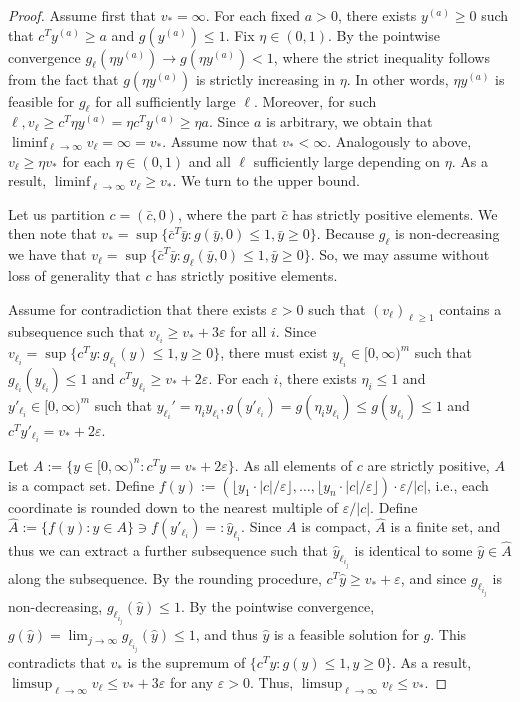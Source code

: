 \documentclass[a4paper, a4wide, 10pt, reqno]{amsart}
\theoremstyle{plain}
\begin{document}
\begin{proof}
    Assume first that $v_\ast=\infty$. For each fixed $a>0$, there exists $y^{(a)}\ge0$ such that $c^Ty^{(a)} \geq a$ and $g(y^{(a)})\leq 1$.
    Fix $\eta\in(0,1)$. By the pointwise convergence $g_\ell(\eta y^{(a)})\to g(\eta y^{(a)})<1$, where the strict inequality follows from the fact that $g(\eta y^{(a)})$ is strictly increasing in $\eta$. In other words, $\eta y^{(a)}$ is feasible for $g_\ell$ for all sufficiently large $\ell$. Moreover, for such $\ell, v_\ell\ge c^T \eta y^{(a)}=\eta c^Ty^{(a)}\ge \eta a$. Since $a$ is arbitrary, we obtain that $\liminf_{\ell\to\infty} v_\ell =\infty=v_\ast$.
    Assume now that $v_\ast<\infty$. Analogously to above, $v_\ell\ge \eta v_\ast$ for each $\eta\in(0,1)$ and all $\ell$ sufficiently large depending on $\eta$. As a result, $\liminf_{\ell \to\infty} v_\ell \ge v_\ast$. 
    We  turn to the upper bound. 

    Let us partition $c=(\bar{c},0)$, where the part $\bar{c}$ has strictly positive elements. We then note that $v_* = \sup\{\bar{c}^T \bar{y} : g(\bar{y},0) \leq 1, \bar{y} \geq 0\}$. Because $g_\ell$ is  non-decreasing 
    we have that 
$v_\ell = \sup\{\bar{c}^T \bar{y}: g_\ell(\bar{y},0) \leq 1, \bar{y}\geq 0\}.$ 
 So, we may assume without loss of generality that $c$ has strictly positive elements.
 
    Assume for contradiction that there exists $\varepsilon>0$ such that $(v_\ell)_{\ell\ge 1}$ contains a subsequence such that $v_{\ell_i} \ge v_\ast+3\varepsilon$ for all $i$. Since $v_{\ell_i}=\sup \{c^Ty: g_{\ell_i}(y)\le 1, y\ge 0\}$,  there must exist $y_{\ell_i}\in [0,\infty)^m$ such that $g_{\ell_i}(y_{\ell_i})\le 1$ and $c^T y_{\ell_i}\ge v_\ast+2\varepsilon$. For each $i$, there exists $\eta_i\leq 1$ and $y'_{\ell_i}\in[0,\infty)^m$ such that $y_{\ell_i}'=\eta_i y_{\ell_i},  g(y'_{\ell_i}) = g(\eta_i y_{\ell_i}) \le g(y_{\ell_i}) \le 1$ and $c^Ty'_{\ell_i}=v_\ast+2\varepsilon$. 


    Let $A:=\{y\in[0,\infty)^n: c^Ty=v_\ast + 2\varepsilon\}$. As all elements of $c$ are strictly positive, $A$ is a compact set. 
    Define $f(y):=(\lfloor y_1\cdot |c|/\varepsilon\rfloor, \ldots, \lfloor y_n\cdot |c|/\varepsilon\rfloor)\cdot \varepsilon/|c|$, i.e., each coordinate is rounded down to the nearest multiple of $\varepsilon/|c|$. Define $\hat A:=\{f(y): y\in A\}\ni f(y'_{\ell_i})=: \hat y_{\ell_i}$. Since $A$ is compact, $\hat A$ is a finite set, and thus we can extract a further subsequence such that $\hat y_{\ell_{i_j}}$ is identical to some $\hat y\in \hat A$ along the subsequence. By the rounding procedure, $c^T \hat y\ge v_\ast+\varepsilon$, and since $g_{\ell_{i_j}}$ is non-decreasing, $g_{\ell_{i_j}}(\hat y)\le 1$. 
        By the pointwise convergence, $g(\hat y)=\lim_{j\to\infty}g_{\ell_{i_j}}(\hat y)\le 1$, and thus $\hat y$ is a feasible solution for $g$. This contradicts that $v_\ast$ is the supremum of $\{c^Ty: g(y)\le 1, y\ge 0\}$. As a result, $\limsup_{\ell\to\infty}v_\ell\le v_\ast+3\varepsilon$ for any $\varepsilon>0$. Thus, $\limsup_{\ell\to\infty}v_\ell\le v_\ast$. 
\end{proof} 
\end{document}
